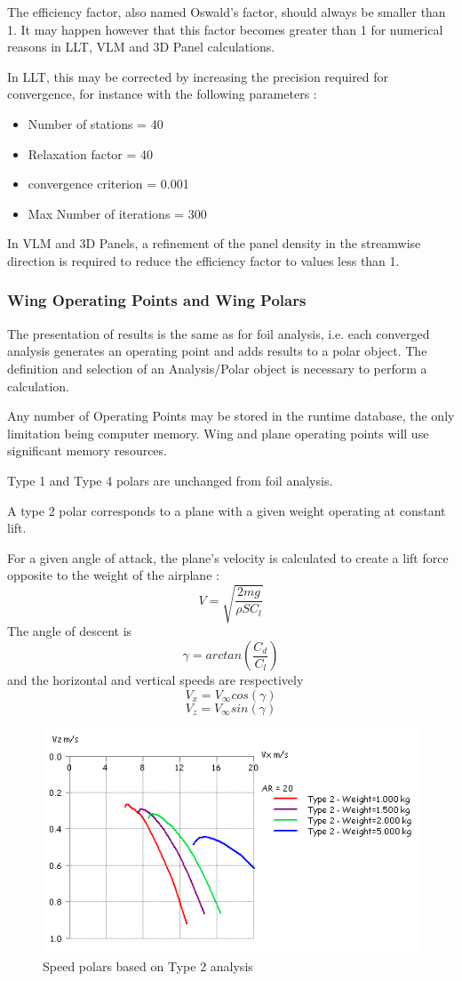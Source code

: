 \documentclass[a4paper,twoside,12pt,dvips]{article}
\begin{document}
The efficiency factor, also named Oswald's factor, should always be
smaller than 1. It may happen however that this factor becomes greater
than 1 for numerical reasons in LLT, VLM and 3D Panel calculations.

In LLT, this may be corrected by increasing the precision required for
convergence, for instance with the following parameters :

\begin{itemize}
\item Number of stations = 40
\item Relaxation factor = 40
\item convergence criterion = 0.001
\item Max Number of iterations = 300
\end{itemize}

In VLM and 3D Panels, a refinement of the panel density in the
streamwise direction is required to reduce the efficiency factor to
values less than 1.

\subsubsection{Wing Operating Points and Wing Polars}

The presentation of results is the same as for foil analysis,
i.e. each converged analysis generates an operating point and adds
results to a polar object. The definition and selection of an
Analysis/Polar object is necessary to perform a calculation.

Any number of Operating Points may be stored in the runtime database,
the only limitation being computer memory. Wing and plane operating
points will use significant memory resources.

Type 1 and Type 4 polars are unchanged from foil analysis.

A type 2 polar corresponds to a plane with a given weight operating at
constant lift.

For a given angle of attack, the plane's velocity is calculated to
create a lift force opposite to the weight of the airplane
: \[V=\sqrt{\frac{2mg}{\rho SC_l}}\] The angle of descent
is \[\gamma=arctan(\frac{C_d}{C_l})\] and the horizontal and vertical
speeds are respectively \[V_x=V_\infty cos(\gamma)\]
\[V_z=V_\infty sin(\gamma)\]

\begin{figure}[htbp]
  \includegraphics[width=0.8\linewidth]{img-34}\centering 
  \caption{Speed polars based on Type 2 analysis}
  \label{fig:speed_polars_based_on_type_2_analysis}
\end{figure}
\end{document}

